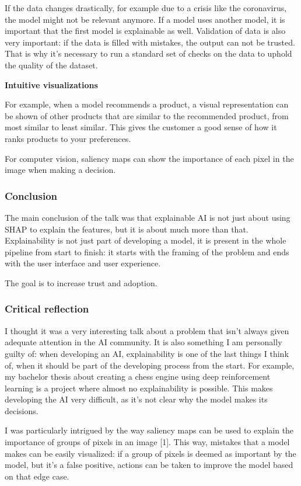 \documentclass{article}
\begin{document}
If the data changes drastically, for example due to a crisis like the coronavirus, the model might not be relevant anymore.
If a model uses another model, it is important that the first model is explainable as well. 
Validation of data is also very important: if the data is filled with mistakes, 
the output can not be trusted. That is why it's necessary to run a standard set of checks
on the data to uphold the quality of the dataset.

\textbf{Intuitive visualizations}

For example, when a model recommends a product, a visual representation can be shown of 
other products that are similar to the recommended product, from most similar to least similar.
This gives the customer a good sense of how it ranks products to your preferences.

For computer vision, saliency maps can show the importance of each pixel in the image when 
making a decision.

\subsubsection{Conclusion}

The main conclusion of the talk was that explainable AI is not just about using SHAP to explain
the features, but it is about much more than that.
Explainability is not just part of developing a model, 
it is present in the whole pipeline from start to finish: it starts with the framing of the problem
and ends with the user interface and user experience.

The goal is to increase trust and adoption.

\subsubsection{Critical reflection}

I thought it was a very interesting talk about a problem that isn't always given adequate 
attention in the AI community. It is also something I am personally guilty of: when developing
an AI, explainability is one of the last things I think of, when it should be part of the 
developing process from the start. For example, my bachelor thesis about creating a chess engine using deep reinforcement learning
is a project where almost no explainability is possible. This makes developing the AI 
very difficult, as it's not clear why the model makes its decisions. 

I was particularly intrigued by the way saliency maps can be used to explain the importance
of groups of pixels in an image [1]. This way, mistakes that a model makes can be easily visualized:
if a group of pixels is deemed as important by the model, but it's a false positive, actions can 
be taken to improve the model based on that edge case.
\end{document}

